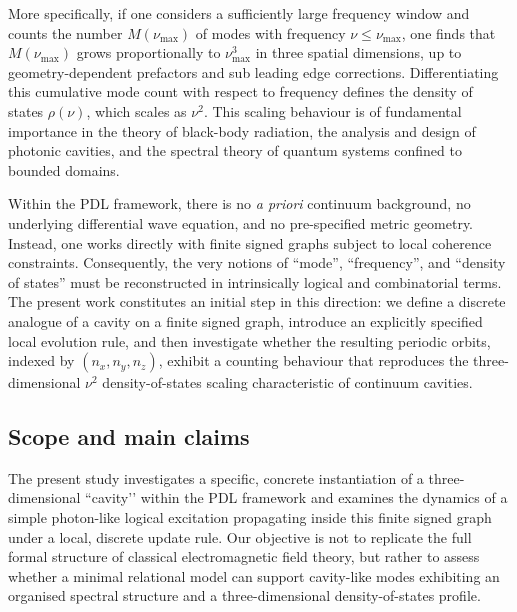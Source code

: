 \documentclass{article}
\theoremstyle{definition}
\begin{document}
More specifically, if one considers a sufficiently large frequency window and counts the number $M(\nu_{\max})$ of modes with frequency $\nu \le \nu_{\max}$, one finds that $M(\nu_{\max})$ grows proportionally to $\nu_{\max}^3$ in three spatial dimensions, up to geometry-dependent prefactors and sub leading edge corrections.\cite{Density_of_states_Notes,Counting_States_2021} Differentiating this cumulative mode count with respect to frequency defines the density of states $\rho(\nu)$, which scales as $\nu^2$. This scaling behaviour is of fundamental importance in the theory of black-body radiation, the analysis and design of photonic cavities, and the spectral theory of quantum systems confined to bounded domains.\cite{Density_of_states_Notes,EM_Cavities_Notes}

Within the PDL framework, there is no \emph{a priori} continuum background, no underlying differential wave equation, and no pre-specified metric geometry.\cite{PDL_Main_2026,PDL_Intro_2026} Instead, one works directly with finite signed graphs subject to local coherence constraints. Consequently, the very notions of “mode”, “frequency”, and “density of states” must be reconstructed in intrinsically logical and combinatorial terms. The present work constitutes an initial step in this direction: we define a discrete analogue of a cavity on a finite signed graph, introduce an explicitly specified local evolution rule, and then investigate whether the resulting periodic orbits, indexed by $(n_x,n_y,n_z)$, exhibit a counting behaviour that reproduces the three-dimensional $\nu^2$ density-of-states scaling characteristic of continuum cavities.\cite{Effective_Fields_PDL_2026,PDL_Global_Mapping_2026}

\subsection{Scope and main claims}

The present study investigates a specific, concrete instantiation of a three-dimensional “cavity’’ within the PDL framework and examines the dynamics of a simple photon-like logical excitation propagating inside this finite signed graph under a local, discrete update rule.\cite{PDL_Main_2026,Effective_Fields_PDL_2026} Our objective is not to replicate the full formal structure of classical electromagnetic field theory, but rather to assess whether a minimal relational model can support cavity-like modes exhibiting an organised spectral structure and a three-dimensional density-of-states profile.
\end{document}
